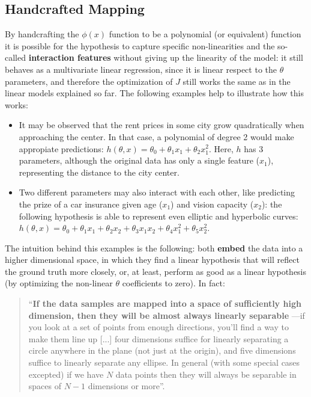\subsection{Handcrafted Mapping}

By handcrafting the \(\phi(x)\) function to be a polynomial (or equivalent) function it is possible for the hypothesis to capture specific non-linearities and the so-called \textbf{interaction features} without giving up the linearity of the model: it still behaves as a multivariate linear regression, since it is linear respect to the \(\theta\) parameters, and therefore the optimization of \(J\) still works the same as in the linear models explained so far. The following examples help to illustrate how this works:

\begin{itemize}
\item It may be observed that the rent prices in some city grow quadratically when approaching the center. In that case, a polynomial of degree 2 would make appropiate predictions: \(h(\theta, x) = \theta_0+\theta_1x_1+\theta_2x_1^2\). Here, \(h\) has 3 parameters, although the original data has only a single feature (\(x_1\)), representing the distance to the city center.
\item Two different parameters may also interact with each other, like predicting the prize of a car insurance given age (\(x_1\)) and vision capacity (\(x_2\)): the following hypothesis is able to represent even elliptic and hyperbolic curves: \(h(\theta, x) = \theta_0+\theta_1x_1+\theta_2x_2+\theta_3x_1x_2+\theta_4x_1^2+\theta_5x_2^2\).
\end{itemize}

The intuition behind this examples is the following:  both \textbf{embed} the data into a higher dimensional space, in which they find a linear hypothesis that will reflect the ground truth more closely, or, at least, perform as good as a linear hypothesis (by optimizing the non-linear \(\theta\) coefficients to zero). In fact:
\begin{quote}
  ``\textbf{If the data samples are mapped into a space of sufficiently high dimension, then they will be almost always linearly separable} ---if you look at a set of points from enough directions, you'll find a way to make them line up [...] four dimensions suffice for linearly separating a circle anywhere in the plane (not just at the origin), and five dimensions suffice to linearly separate any ellipse. In general (with some special cases excepted) if we have \(N\) data points then they will always be separable in spaces of \(N-1\) dimensions or more''\cite[p. 746]{russell}.
\end{quote}

